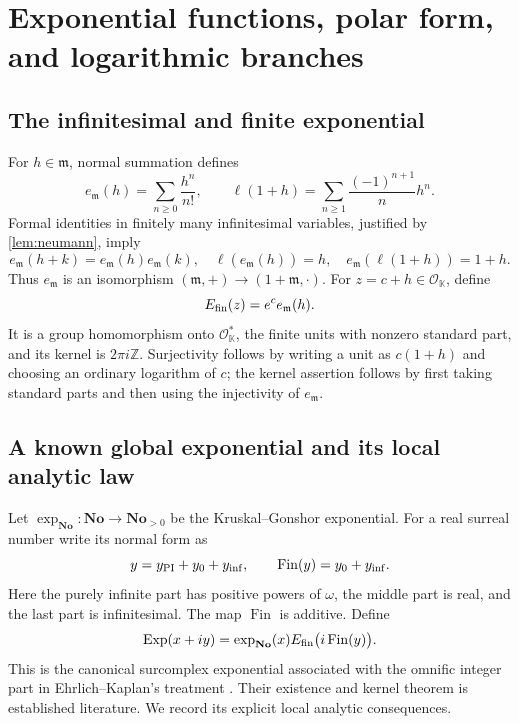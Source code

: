\documentclass[11pt,letterpaper]{article}
\numberwithin{equation}{section}
\theoremstyle{definition}
\theoremstyle{remark}
\newcommand{\No}{\mathbf{No}}
\newcommand{\K}{\mathbb K}
\newcommand{\Z}{\mathbb Z}
\newcommand{\OO}{\mathcal O}
\newcommand{\mm}{\mathfrak m}
\DeclareMathOperator{\Exp}{Exp}
\DeclareMathOperator{\Fin}{Fin}
\begin{document}
\section{Exponential functions, polar form, and logarithmic branches}
\label{sec:exp}

\subsection{The infinitesimal and finite exponential}

For $h\in\mm$, normal summation defines
\[
 e_{\mm}(h)=\sum_{n\ge0}\frac{h^n}{n!},\qquad
 \ell(1+h)=\sum_{n\ge1}\frac{(-1)^{n+1}}n h^n.
\]
Formal identities in finitely many infinitesimal variables, justified by
\cref{lem:neumann}, imply
\[
 e_{\mm}(h+k)=e_{\mm}(h)e_{\mm}(k),\quad
 \ell(e_{\mm}(h))=h,\quad e_{\mm}(\ell(1+h))=1+h.
\]
Thus $e_{\mm}$ is an isomorphism $(\mm,+)\to(1+\mm,\cdot)$.
For $z=c+h\in\OO_\K$, define
\[
 E_{\rm fin}(z)=e^c e_{\mm}(h).
\]
It is a group homomorphism onto $\OO_\K^*$, the finite units with nonzero
standard part, and its kernel is $2\pi i\Z$. Surjectivity follows by
writing a unit as $c(1+h)$ and choosing an ordinary logarithm of $c$;
the kernel assertion follows by first taking standard parts and then
using the injectivity of $e_{\mm}$.

\subsection{A known global exponential and its local analytic law}

Let $\exp_{\No}:\No\to\No_{>0}$ be the Kruskal--Gonshor exponential.
For a real surreal number write its normal form as
\[
 y=y_{\rm PI}+y_0+y_{\rm inf},\qquad
 \Fin(y)=y_0+y_{\rm inf}.
\]
Here the purely infinite part has positive powers of $\omega$, the
middle part is real, and the last part is infinitesimal.
The map $\Fin$ is additive. Define
\begin{equation}\label{eq:globalexp}
 \Exp(x+iy)=\exp_{\No}(x)E_{\rm fin}\bigl(i\Fin(y)\bigr).
\end{equation}
This is the canonical surcomplex exponential associated with the omnific
integer part in Ehrlich--Kaplan's treatment \cite[Section 11]{EK}.
Their existence and kernel theorem is established literature. We record
its explicit local analytic consequences.
\end{document}
